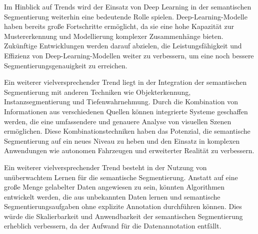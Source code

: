 Im Hinblick auf Trends wird der Einsatz von Deep Learning in der semantischen
Segmentierung weiterhin eine bedeutende Rolle spielen. Deep-Learning-Modelle
haben bereits große Fortschritte ermöglicht, da sie eine hohe Kapazität zur
Mustererkennung und Modellierung komplexer Zusammenhänge bieten. Zukünftige
Entwicklungen werden darauf abzielen, die Leistungsfähigkeit und Effizienz von
Deep-Learning-Modellen weiter zu verbessern, um eine noch bessere
Segmentierungsgenauigkeit zu erreichen.

Ein weiterer vielversprechender Trend liegt in der Integration der semantischen
Segmentierung mit anderen Techniken wie Objekterkennung, Instanzsegmentierung
und Tiefenwahrnehmung. Durch die Kombination von Informationen aus
verschiedenen Quellen können integrierte Systeme geschaffen werden, die eine
umfassendere und genauere Analyse von visuellen Szenen ermöglichen. Diese
Kombinationstechniken haben das Potenzial, die semantische Segmentierung auf
ein neues Niveau zu heben und den Einsatz in komplexen Anwendungen wie
autonomen Fahrzeugen und erweiterter Realität zu verbessern.

Ein weiterer vielversprechender Trend besteht in der Nutzung von unüberwachtem
Lernen für die semantische Segmentierung. Anstatt auf eine große Menge
gelabelter Daten angewiesen zu sein, könnten Algorithmen entwickelt werden, die
aus unbekannten Daten lernen und semantische Segmentierungsaufgaben ohne
explizite Annotation durchführen können. Dies würde die Skalierbarkeit und
Anwendbarkeit der semantischen Segmentierung erheblich verbessern, da der
Aufwand für die Datenannotation entfällt.